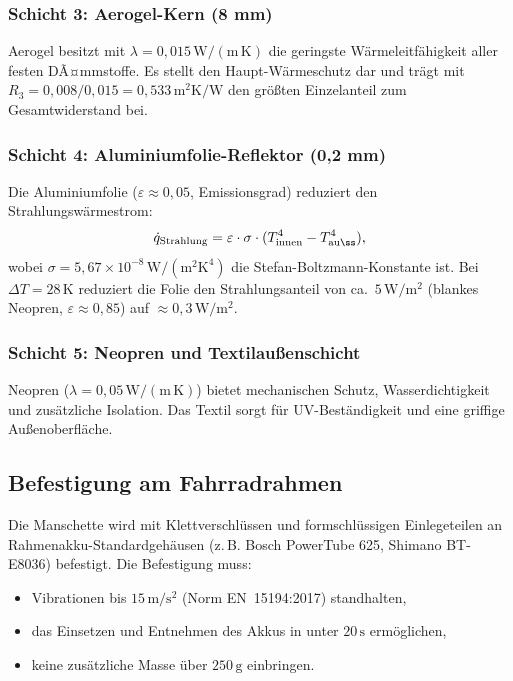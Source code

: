 ﻿\documentclass[a4paper,12pt]{article}
\theoremstyle{definition}
\begin{document}
\subsubsection{Schicht 3: Aerogel-Kern (8 mm)}

Aerogel besitzt mit $\lambda = 0{,}015\,\mathrm{W/(m\,K)}$ die geringste W\"armeleitf\"ahigkeit aller festen DÃ¤mmstoffe. Es stellt den Haupt-W\"armeschutz dar und tr\"agt mit $R_3 = 0{,}008/0{,}015 = 0{,}533\,\mathrm{m^2 K/W}$ den gr\"o\ss{}ten Einzelanteil zum Gesamtwiderstand bei.

\subsubsection{Schicht 4: Aluminiumfolie-Reflektor (0,2 mm)}

Die Aluminiumfolie ($\varepsilon \approx 0{,}05$, Emissionsgrad) reduziert den Strahlungsw\"armestrom:
\[
  \dot{q}_\mathrm{Strahlung} = \varepsilon \cdot \sigma \cdot (T_\mathrm{innen}^4 - T_\mathrm{au\ss}^4),
\]
wobei $\sigma = 5{,}67 \times 10^{-8}\,\mathrm{W/(m^2 K^4)}$ die Stefan-Boltzmann-Konstante ist. Bei $\Delta T = 28\,\mathrm{K}$ reduziert die Folie den Strahlungsanteil von ca.\ $5\,\mathrm{W/m^2}$ (blankes Neopren, $\varepsilon \approx 0{,}85$) auf $\approx 0{,}3\,\mathrm{W/m^2}$.

\subsubsection{Schicht 5: Neopren und Textilau\ss{}enschicht}

Neopren ($\lambda = 0{,}05\,\mathrm{W/(m\,K)}$) bietet mechanischen Schutz, Wasserdichtigkeit und zus\"atzliche Isolation. Das Textil sorgt f\"ur UV-Best\"andigkeit und eine griffige Au\ss{}enoberfl\"ache.

\subsection{Befestigung am Fahrradrahmen}

Die Manschette wird mit Klettverschl\"ussen und formschl\"ussigen Einlegeteilen an Rahmenak\-ku-Standardgeh\"ausen (z.\,B. Bosch PowerTube 625, Shimano BT-E8036) befestigt. Die Befestigung muss:
\begin{itemize}
  \item Vibrationen bis $15\,\mathrm{m/s^2}$ (Norm EN~15194:2017) standhalten,
  \item das Einsetzen und Entnehmen des Akkus in unter $20\,\mathrm{s}$ erm\"oglichen,
  \item keine zus\"atzliche Masse \"uber $250\,\mathrm{g}$ einbringen.
\end{itemize}
\end{document}
